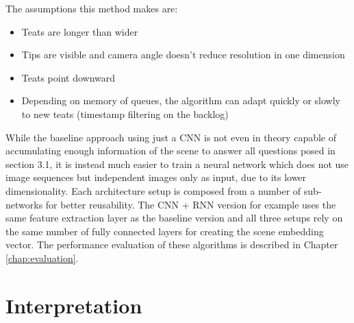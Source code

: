     The assumptions this method makes are:
        \begin{itemize}
            \item Teats are longer than wider
            \item Tips are visible and camera angle doesn't reduce resolution in one dimension
            \item Teats point downward
            \item Depending on memory of queues, the algorithm can adapt quickly or slowly to new teats (timestamp filtering on the backlog)
        \end{itemize}
    \lipsum[2]
    
    While the baseline approach using just a CNN is not even in theory capable of accumulating enough
information of the scene to answer all questions posed in section 3.1, it is instead much easier to
train a neural network which does not use image sequences but independent images only as input, due
to its lower dimensionality. Each architecture setup is composed from a number of sub-networks for
better reusability. The CNN + RNN version for example uses the same feature extraction layer as the
baseline version and all three setups rely on the same number of fully connected layers for creating the
scene embedding vector. 
The performance evaluation of these algorithms is described in Chapter \ref{chap:evaluation}.

\section{Interpretation}\label{chap:3:interpretation}

